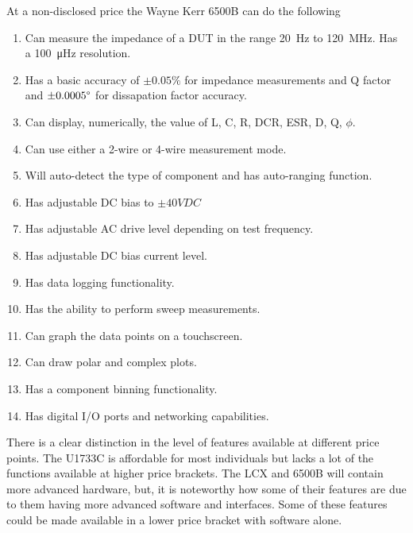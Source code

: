   At a non-disclosed price the Wayne Kerr 6500B can do the following
\begin{enumerate}
    \item Can measure the impedance of a DUT in the range \SI[]{20}{\hertz} to \SI[]{120}{\mega\hertz}. Has a \SI[]{100}{\micro\hertz} resolution. 
    \item Has a basic accuracy of $\pm 0.05\%$ for impedance measurements and Q factor and $\pm 0.0005\degree$ for dissapation factor accuracy.
    \item Can display, numerically, the value of L, C, R, DCR, ESR, D, Q, $\phi$.
    \item Can use either a 2-wire or 4-wire measurement mode.
    \item Will auto-detect the type of component and has auto-ranging function.
    \item Has adjustable DC bias to $\pm 40VDC$
    \item Has adjustable AC drive level depending on test frequency.
    \item Has adjustable DC bias current level.
    \item Has data logging functionality.
    \item Has the ability to perform sweep measurements.
    \item Can graph the data points on a touchscreen.
    \item Can draw polar and complex plots.
    \item Has a component binning functionality.
    \item Has digital I/O ports and networking capabilities.
  \end{enumerate}

  There is a clear distinction in the level of features available at different price points. The U1733C is affordable for most individuals but lacks a lot of the functions available at higher price brackets. The LCX and 6500B will contain more advanced hardware, but, it is noteworthy how some of their features are due to them having more advanced software and interfaces. Some of these features could be made available in a lower price bracket with software alone.

